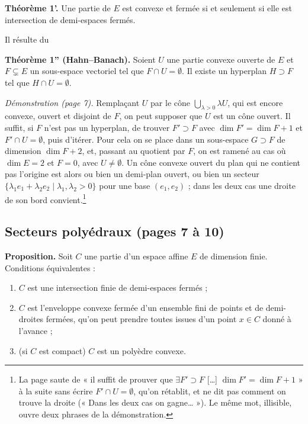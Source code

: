 \documentclass[11pt,a4paper]{article}
\begin{document}
\textbf{Théorème 1'.} Une partie de $E$ est convexe et fermée si et seulement si
elle est intersection de demi-espaces fermés.

Il résulte du

\textbf{Théorème 1'' (Hahn--Banach).} Soient $U$ une partie convexe ouverte de
$E$ et $F \subsetneq E$ un sous-espace vectoriel tel que $F \cap U =
\emptyset$. Il existe un hyperplan $H \supset F$ tel que $H \cap U =
\emptyset$.

\emph{Démonstration (page 7).} Remplaçant $U$ par le cône $\bigcup_{\lambda > 0}
\lambda U$, qui est encore convexe, ouvert et disjoint de $F$, on peut supposer
que $U$ est un cône ouvert. Il suffit, si $F$ n'est pas un hyperplan, de trouver
$F' \supset F$ avec $\dim F' = \dim F + 1$ et $F' \cap U = \emptyset$, puis
d'itérer. Pour cela on se place dans un sous-espace $G \supset F$ de dimension
$\dim F + 2$, et, passant au quotient par $F$, on est ramené au cas où
$\dim E = 2$ et $F = 0$, avec $U \neq \emptyset$. Un cône convexe ouvert du
plan qui ne contient pas l'origine est alors ou bien un demi-plan ouvert, ou
bien un secteur $\{\lambda_{1} e_{1} + \lambda_{2} e_{2} \mid \lambda_{1},
\lambda_{2} > 0\}$ pour une base $(e_{1}, e_{2})$ ; dans les deux cas une droite
de son bord convient.\footnote{La page saute de « il suffit de prouver que
$\exists F' \supset F$ […] $\dim F' = \dim F + 1$ » à la suite sans écrire
$F' \cap U = \emptyset$, qu'on rétablit, et ne dit pas comment on trouve la
droite (« Dans les deux cas on gagne… »). Le même mot, illisible, ouvre deux
phrases de la démonstration.}

\subsection*{Secteurs polyédraux (pages 7 à 10)}

\textbf{Proposition.} Soit $C$ une partie d'un espace affine $E$ de dimension
finie. Conditions équivalentes :
\begin{enumerate}
\item[a)] $C$ est une intersection finie de demi-espaces fermés ;
\item[b)] $C$ est l'enveloppe convexe fermée d'un ensemble fini de points et de
demi-droites fermées, qu'on peut prendre toutes issues d'un point $x \in C$
donné à l'avance ;
\item[b')] (si $C$ est compact) $C$ est un polyèdre convexe.
\end{enumerate}
\end{document}
